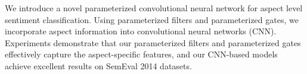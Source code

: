We introduce a novel parameterized convolutional neural network for aspect level sentiment classification. Using parameterized filters and parameterized gates, we incorporate aspect information into convolutional neural networks (CNN). Experiments demonstrate that our parameterized filters and parameterized gates effectively capture the aspect-specific features, and our CNN-based models achieve excellent results on SemEval 2014 datasets.
